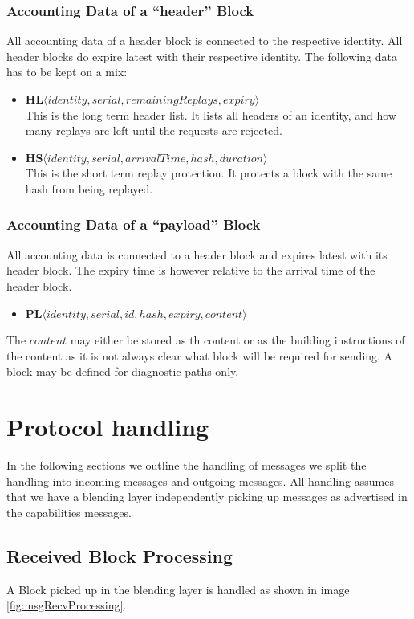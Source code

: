 \subsubsection{Accounting Data of a ``header'' Block}
All accounting data of a header block is connected to the respective identity. All header blocks do expire latest with their respective identity. The following data has to be kept on a mix:
\begin{itemize}
	\item $\mathbf{HL}\langle identity, serial, remainingReplays, expiry\rangle$\\
	      This is the long term header list. It lists all headers of an identity, and how many replays are left until the requests are rejected.
	\item $\mathbf{HS}\langle identity, serial, arrivalTime, hash, duration \rangle$\\
	      This is the short term replay protection. It protects a block with the same hash from being replayed.
\end{itemize}

\subsubsection{Accounting Data of a ``payload'' Block}
All accounting data is connected to a header block and expires latest with its header block. The expiry time is however relative to the arrival time of the header block.
\begin{itemize}
	\item $\mathbf{PL}\langle identity, serial, id, hash, expiry, content\rangle$\\
\end{itemize}

The $content$ may either be stored as th content or as the building instructions of the content as it is not always clear what block will be required for sending. A block may be defined for diagnostic paths only.

\section{Protocol handling}
In the following sections we outline the handling of messages we split the handling into incoming messages and outgoing messages. All handling assumes that we have a blending layer independently picking up messages as advertised in the capabilities messages.

\subsection{Received Block Processing}
A Block picked up in the blending layer is handled as shown in image \ref{fig:msgRecvProcessing}.

